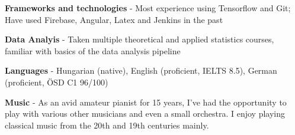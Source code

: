 \documentclass[12pt,a4paper,sans]{moderncv}
\begin{document}
\textbf{Frameworks and technologies} - {Most experience using Tensorflow and Git; Have used Firebase, Angular, Latex and Jenkins in the past}

\vspace{3mm}

\textbf{Data Analyis} - {Taken multiple theoretical and applied statistics courses, familiar with basics of the data analysis pipeline}

\vspace{3mm}

\textbf{Languages} - {Hungarian (native), English (proficient, IELTS 8.5), German (proficient, ÖSD C1 96/100)}

\vspace{3mm}

\textbf{Music} - {As an avid amateur pianist for 15 years, I've had the opportunity to play with various other musicians and even a small orchestra. I enjoy playing classical music from the 20th and 19th centuries mainly. }
\end{document}

